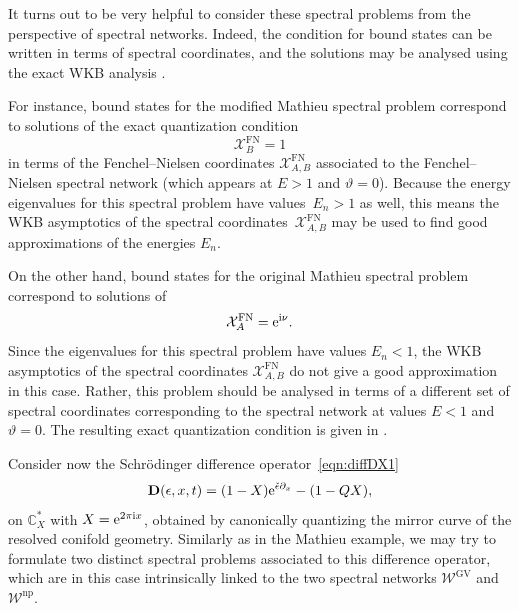 \documentclass[pdftex]{sigma}
\numberwithin{equation}{section}
\begin{document}
It turns out to be very helpful to consider these spectral problems from the perspective of spectral networks. Indeed, the condition for bound states can be written in terms of spectral coordinates, and the solutions may be analysed using the exact WKB analysis \cite{Hollands:t3abel}.

For instance, bound states for the modified Mathieu spectral problem correspond to solutions of the exact quantization condition
\begin{equation*}
 \mathcal{X}^\mathrm{FN}_B = 1
\end{equation*}
in terms of the Fenchel--Nielsen coordinates $\mathcal{X}^\mathrm{FN}_{A,B}$ associated to the Fenchel--Nielsen spectral network (which appears at $E>1$ and $\vartheta = 0$). Because the energy eigenvalues for this spectral problem have values~$E_n>1$ as well, this means the WKB asymptotics of the spectral coordinates~$\mathcal{X}^\mathrm{FN}_{A,B}$ may be used to find good approximations of the energies $E_n$.

On the other hand, bound states for the original Mathieu spectral problem correspond to solutions of
\begin{equation*}
 \mathcal{X}^\mathrm{FN}_A = {\rm e}^{{\rm i} \nu}.
\end{equation*}
Since the eigenvalues for this spectral problem have values $E_n<1$, the WKB asymptotics of the spectral coordinates $\mathcal{X}^\mathrm{FN}_{A,B}$ do not give a good approximation in this case. Rather, this problem should be analysed in terms of a different set of spectral coordinates corresponding to the spectral network at values $E<1$ and $\vartheta =0$. The resulting exact quantization condition is given in \cite[equation~(4.25)]{Hollands:t3abel}.

Consider now the Schr\"odinger difference operator~\eqref{eqn:diffDX1}
\begin{equation*}%
 \mathbf{D}(\epsilon,x,t) = (1-X) {\rm e}^{\check{\epsilon} \partial_x} - (1 - Q X),
\end{equation*}
on $\mathbb{C}^*_X$ with $X = {\rm e}^{2 \pi {\rm i} x}$, obtained by canonically quantizing the mirror curve of the resolved conifold geometry. Similarly as in the Mathieu example, we may try to formulate two distinct spectral problems associated to this difference operator, which are in this case intrinsically linked to the two spectral networks $\mathcal{W}^\mathrm{GV}$ and $\mathcal{W}^\mathrm{np}$.
\end{document}
